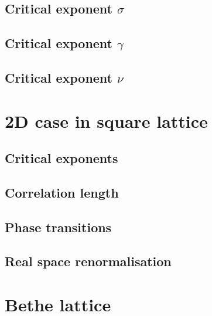 \subsection{Critical exponent $\sigma$}

\subsection{Critical exponent $\gamma$}

\subsection{Critical exponent $\nu$}



\section{2D case in square lattice}\label{sec:2dsquare}


\subsection{Critical exponents}

\subsection{Correlation length}

\subsection{Phase transitions}

\subsection{Real space renormalisation}



\section{Bethe lattice}\label{sec:2dgeneral}




